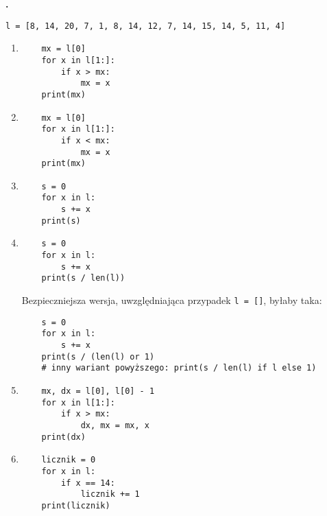 \documentclass[a4paper]{article}
\begin{document}
\textbf{.}\addtocounter{zadanie}{1} \texttt{l = [8, 14, 20, 7, 1, 8, 14, 12, 7, 14, 15, 14, 5, 11, 4]}
\begin{enumerate}[label=\arabic*.]
    \lstset{numbers=none}
    \item \begin{lstlisting}
    mx = l[0]
    for x in l[1:]:
        if x > mx:
            mx = x
    print(mx)
    \end{lstlisting}

    \item \begin{lstlisting}
    mx = l[0]
    for x in l[1:]:
        if x < mx:
            mx = x
    print(mx)
    \end{lstlisting}

    \item \begin{lstlisting}
    s = 0
    for x in l:
        s += x
    print(s)
    \end{lstlisting}

    \item \begin{lstlisting}
    s = 0
    for x in l:
        s += x
    print(s / len(l))
    \end{lstlisting}
    Bezpieczniejsza wersja, uwzględniająca przypadek \lstinline|l = []|, byłaby taka:

    \begin{lstlisting}
    s = 0
    for x in l:
        s += x
    print(s / (len(l) or 1)
    # inny wariant powyższego: print(s / len(l) if l else 1)
    \end{lstlisting}

    \item \begin{lstlisting}
    mx, dx = l[0], l[0] - 1
    for x in l[1:]:
        if x > mx:
            dx, mx = mx, x
    print(dx)
    \end{lstlisting}

    \item \begin{lstlisting}
    licznik = 0
    for x in l:
        if x == 14:
            licznik += 1
    print(licznik)
    \end{lstlisting}

\end{enumerate}

\end{document}
